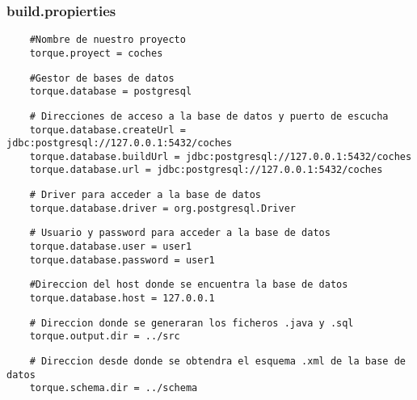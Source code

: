 \documentclass[24pt, a4paper, oneside, spanish]{beamer}
\begin{document}
\begin{frame}
	\frametitle{build.propierties}
	
	\begin{lstlisting}
	#Nombre de nuestro proyecto
	torque.proyect = coches
	\end{lstlisting}
	
	\begin{lstlisting}
	#Gestor de bases de datos
	torque.database = postgresql
	\end{lstlisting}
	
	\begin{lstlisting}
	# Direcciones de acceso a la base de datos y puerto de escucha
	torque.database.createUrl = jdbc:postgresql://127.0.0.1:5432/coches
	torque.database.buildUrl = jdbc:postgresql://127.0.0.1:5432/coches
	torque.database.url = jdbc:postgresql://127.0.0.1:5432/coches	
	\end{lstlisting}
	
	\begin{lstlisting}
	# Driver para acceder a la base de datos
	torque.database.driver = org.postgresql.Driver
	\end{lstlisting}
	
	\begin{lstlisting}
	# Usuario y password para acceder a la base de datos
	torque.database.user = user1
	torque.database.password = user1
	\end{lstlisting}
	
	\begin{lstlisting}
	#Direccion del host donde se encuentra la base de datos
	torque.database.host = 127.0.0.1
	\end{lstlisting}
	
	\begin{lstlisting}
	# Direccion donde se generaran los ficheros .java y .sql
	torque.output.dir = ../src
	\end{lstlisting}
	
	\begin{lstlisting}
	# Direccion desde donde se obtendra el esquema .xml de la base de datos
	torque.schema.dir = ../schema
	\end{lstlisting}
\end{frame}

\begin{frame}
	
\end{frame}
\end{document}
